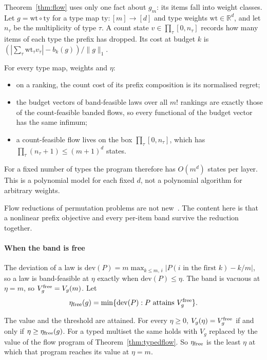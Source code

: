 Theorem~\ref{thm:flow} uses only one fact about $g_m$: its items fall into weight classes. Let
$g=\mathrm{wt}\circ\mathrm{ty}$ for a type map $\mathrm{ty}:[m]\to[d]$ and type weights
$\mathrm{wt}\in\mathbb R^d$, and let $n_\tau$ be the multiplicity of type $\tau$. A count state
$v\in\prod_\tau[0,n_\tau]$ records how many items of each type the prefix has dropped. Its cost
at budget $k$ is $(|\sum_\tau\mathrm{wt}_\tau v_\tau|-b_k(g))/\|g\|_1$.

\begin{theorem}
\label{thm:typedflow}
For every type map, weights and $\eta$:
\begin{itemize}
\item on a ranking, the count cost of its prefix composition is its normalised regret;
\item the budget vectors of band-feasible laws over all $m!$ rankings are exactly those of the
count-feasible banded flows, so every functional of the budget vector has the same infimum;
\item a count-feasible flow lives on the box $\prod_\tau[0,n_\tau]$, which has
$\prod_\tau(n_\tau+1)\le(m+1)^d$ states.
\end{itemize}
For a fixed number of types the program therefore has $O(m^d)$ states per layer. This is a
polynomial model for each fixed $d$, not a polynomial algorithm for arbitrary weights.
\end{theorem}

Flow reductions of permutation problems are not new~\cite{schrijver2003}. The content here is
that a nonlinear prefix objective and every per-item band survive the reduction together.

\paragraph{When the band is free} The deviation of a law is
$\mathrm{dev}(P)=m\max_{k\le m,\,i}|P(i\text{ in the first }k)-k/m|$, so a law is band-feasible
at $\eta$ exactly when $\mathrm{dev}(P)\le\eta$. The band is vacuous at $\eta=m$, so
$V^{\rm free}_g=V_g(m)$. Let
\[
\eta_{\rm free}(g)=\min\{\mathrm{dev}(P):P\ \text{attains}\ V^{\rm free}_g\}.
\]

\begin{theorem}
\label{thm:freeband}
The value and the threshold are attained. For every $\eta\ge0$,
$V_g(\eta)=V^{\rm free}_g$ if and only if $\eta\ge\eta_{\rm free}(g)$. For a typed multiset
the same holds with $V_g$ replaced by the value of the flow program of
Theorem~\ref{thm:typedflow}. So $\eta_{\rm free}$ is the least $\eta$ at which that program
reaches its value at $\eta=m$.
\end{theorem}

